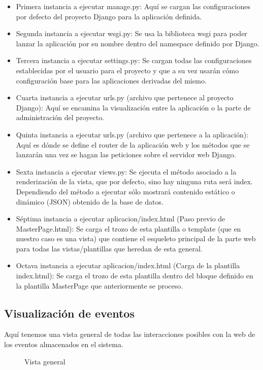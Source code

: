 \begin{itemize}
\item Primera instancia a ejecutar manage.py: Aquí se cargan las configuraciones por defecto del proyecto Django para la aplicación definida.
\item Segunda instancia a ejecutar wsgi.py: Se usa la biblioteca wsgi para poder lanzar la aplicación por su nombre dentro del namespace definido por Django.
\item Tercera instancia a ejecutar settings.py: Se cargan todas las configuraciones establecidas por el usuario para el proyecto y que a su vez usarán cómo configuración base para las aplicaciones derivadas del mismo.
\item Cuarta instancia a ejecutar urls.py (archivo que pertenece al proyecto Django): Aquí se encamina la visualización entre la aplicación o la parte de administración del proyecto.
\item Quinta instancia a ejecutar urls.py (archivo que pertenece a la aplicación): Aquí es dónde se define el router de la aplicación web y los métodos que se lanzarán una vez se hagan las peticiones sobre el servidor web Django.
\item Sexta instancia a ejecutar views.py: Se ejecuta el método asociado a la renderización de la vista, que por defecto, sino hay ninguna ruta será index. Dependiendo del método a ejecutar sólo mostrará contenido estático o dinámico (JSON) obtenido de la base de datos.
\item Séptima instancia a ejecutar aplicacion/index.html (Paso previo de MasterPage.html): Se carga el trozo de esta plantilla o template (que en nuestro caso es una vista) que contiene el esqueleto principal de la parte web para todas las vistas/plantillas que heredan de esta general.
\item Octava instancia a ejecutar aplicacion/index.html (Carga de la plantilla index.html): Se carga el trozo de esta plantilla dentro del bloque definido en la plantilla MasterPage que anteriormente se proceso.
\end{itemize}


\subsection{Visualización de eventos}

Aquí tenemos una vista general de todas las interacciones posibles con la web de los eventos almacenados en el sistema.
\newpage
\begin{figure}[H]
\caption{Vista general}
\end{figure}
